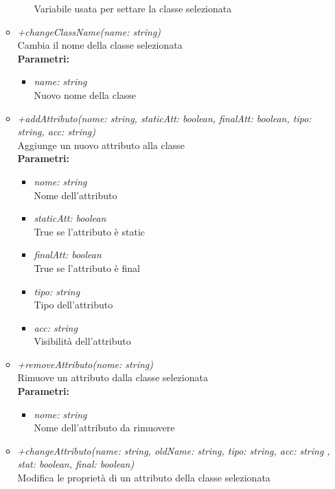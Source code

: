 \begin{itemize}
\begin{itemize}
\begin{itemize}
    			Variabile usata per settare la classe selezionata
    		\end{itemize}
    		\item \emph{+changeClassName(name: string)}\\
    		Cambia il nome della classe selezionata\\
    		\textbf{Parametri:}
    		\begin{itemize}
    			\item \emph{name: string}\\
    			Nuovo nome della classe
    		\end{itemize}
    		\item \emph{+addAttributo(nome: string, staticAtt: boolean, finalAtt: boolean, tipo: string, acc: string)}\\
    		Aggiunge un nuovo attributo alla classe\\
    		\textbf{Parametri:}
    		\begin{itemize}
    			\item \emph{nome: string}\\
    			Nome dell'attributo
    			\item \emph{staticAtt: boolean}\\
    			True se l'attributo è static
    			\item \emph{finalAtt: boolean}\\
    			True se l'attributo è final
    			\item \emph{tipo: string}\\
    			Tipo dell'attributo
    			\item \emph{acc: string}\\
    			Visibilità dell'attributo
    		\end{itemize}
    		\item \emph{+removeAttributo(nome: string)}\\
    		Rimuove un attributo dalla classe selezionata\\
    		\textbf{Parametri:}
    		\begin{itemize}
    			\item \emph{nome: string}\\
    			Nome dell'attributo da rimuovere
    		\end{itemize}
    		\item \emph{+changeAttributo(name: string, oldName: string, tipo: string, acc: string , stat: boolean, final: boolean)}\\
    		Modifica le proprietà di un attributo della classe selezionata\\

\end{itemize}
\end{itemize}
